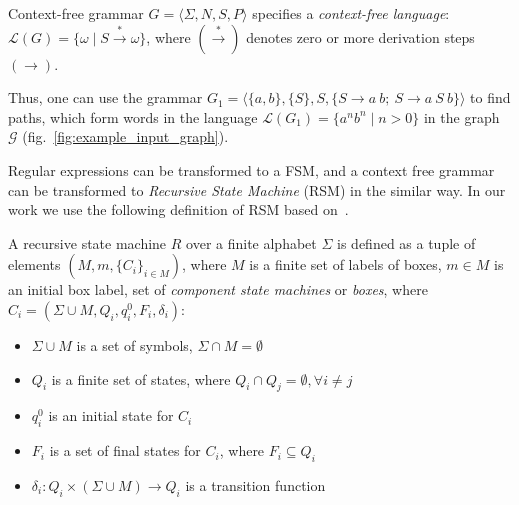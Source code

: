 \begin{definition}
Context-free grammar $G=\langle\Sigma, N, S, P\rangle$ specifies a \textit{context-free language}: $\mathcal{L}(G) = \{\omega \mid S \xrightarrow{*} \omega \}$, where $(\xrightarrow{*})$ denotes zero or more derivation steps $(\to)$.
\end{definition}

Thus, one can use the grammar $G_1 = \langle \{a,b\}, \{S\}, S, \{S \to a \ b; \ S \to a \ S \ b\} \rangle$ to find paths, which form words in the language $\mathcal{L}(G_1) = \{a^n b^n \mid n > 0\}$ in the graph $\mathcal{G}$ (fig.~\ref{fig:example_input_graph}).


Regular expressions can be transformed to a FSM, and a context free grammar can be transformed to \textit{Recursive State Machine} (RSM) in the similar way.
In our work we use the following definition of RSM based
on~\cite{rsm:analysis:10.1007/3-540-44585-4_18}.

\begin{definition}
A recursive state machine $R$ over a finite alphabet $\Sigma$ is defined as a tuple of elements $(M,m,\{C_i\}_{i \in M})$, where $M$ is a finite set of labels of boxes,
$m \in M$ is an initial box label, set of \textit{component state machines} or \textit{boxes},
          where $C_i=(\Sigma \cup M, Q_i,q_i^0,F_i,\delta_i)$:
    \begin{itemize}
        \item $\Sigma \cup M$ is a set of symbols, $\Sigma \cap M = \emptyset$
        \item $Q_i$ is a finite set of states,
              where $Q_i \cap Q_j = \emptyset, \forall i \neq j$
        \item $q_i^0$ is an initial state for $C_i$
        \item $F_i$ is a set of final states for $C_i$, where $F_i \subseteq Q_i$
        \item $\delta_i: Q_i \times (\Sigma \cup M) \to Q_i$ is a transition function %
    \end{itemize}

\end{definition}

